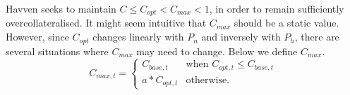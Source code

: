 \noindent Havven seeks to maintain $C \leq C_{opt} < C_{max} < 1$, in order to remain sufficiently overcollateralised. It might seem intuitive that $C_{max}$ should be a static value. However, since $C_{opt}$ changes linearly with $P_n$ and inversely with $P_h$, there are several situations where $C_{max}$ may need to change. Below we define $C_{max}$. \\

\begin{equation}
\label{eq:12}
C_{max,t} = 
\begin{cases}
 C_{base,t} &\mbox{when } C_{opt,t} \leq C_{base,t} \\[1em]
 a * C_{opt,t} &\mbox{otherwise}.
 \end{cases}
\end{equation}

\begin{center}
\end{center}

\newpage